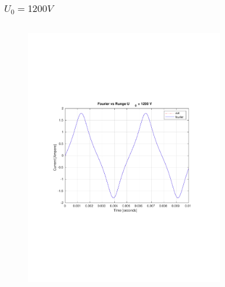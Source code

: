 \documentclass[aspectratio=1610]{beamer}
\begin{document}
\begin{frame}
\frametitle{$U_{0}= 1200V$}
	\begin{columns}
			\begin{figure}
				\includegraphics[scale=0.4]{figs/fourier vs rk4 1200.pdf}
			\end{figure}
			\begin{figure}

\end{figure}
\end{columns}
\end{frame}
\end{document}
